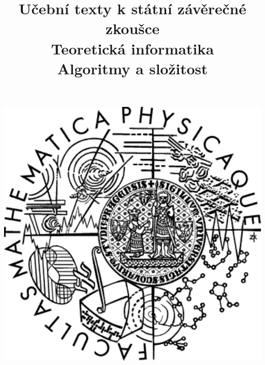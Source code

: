 \clearpage

\clearpage

\title{\LARGE Učební texty k státní závěrečné zkoušce \\ Teoretická informatika \\ Algoritmy a složitost}




\maketitle

\vspace{10mm}
\begin{center}
\includegraphics[scale=0.5]{../common/logo.pdf}
\end{center} 

\clearpage

\clearpage

\tableofcontents









